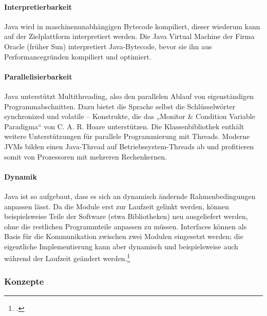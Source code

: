 \paragraph{Interpretierbarkeit}
Java wird in maschinenunabhängigen Bytecode kompiliert, dieser wiederum kann auf der Zielplattform interpretiert werden. Die Java Virtual Machine der Firma Oracle (früher Sun) interpretiert Java-Bytecode, bevor sie ihn aus Performancegründen kompiliert und optimiert.

\paragraph{Parallelisierbarkeit}
Java unterstützt Multithreading, also den parallelen Ablauf von eigenständigen Programmabschnitten. Dazu bietet die Sprache selbst die Schlüsselwörter synchronized und volatile – Konstrukte, die das „Monitor \& Condition Variable Paradigma“ von C. A. R. Hoare unterstützen. Die Klassenbibliothek enthält weitere Unterstützungen für parallele Programmierung mit Threads. Moderne JVMs bilden einen Java-Thread auf Betriebssystem-Threads ab und profitieren somit von Prozessoren mit mehreren Rechenkernen.

\paragraph{Dynamik}
Java ist so aufgebaut, dass es sich an dynamisch ändernde Rahmenbedingungen anpassen lässt. Da die Module erst zur Laufzeit gelinkt werden, können beispielsweise Teile der Software (etwa Bibliotheken) neu ausgeliefert werden, ohne die restlichen Programmteile anpassen zu müssen. Interfaces können als Basis für die Kommunikation zwischen zwei Modulen eingesetzt werden; die eigentliche Implementierung kann aber dynamisch und beispielsweise auch während der Laufzeit geändert werden.\footcite{shit_java_wiki}

\subsubsection{Konzepte}

